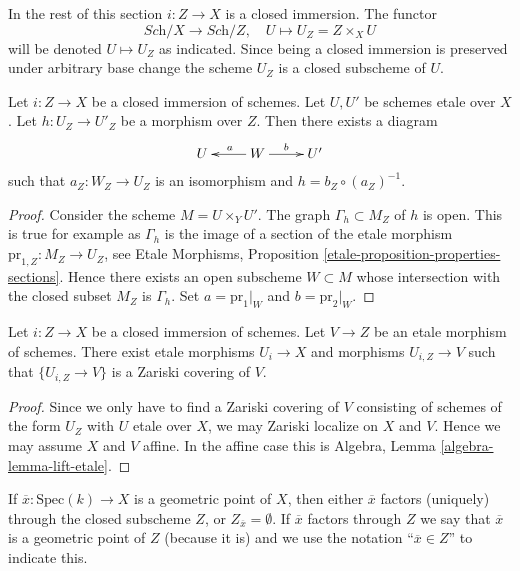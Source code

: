 \medskip\noindent
In the rest of this section $i : Z \to X$ is a closed immersion.
The functor
$$
\textit{Sch}/X \longrightarrow \textit{Sch}/Z,\quad
U \longmapsto U_Z = Z \times_X U
$$
will be denoted $U \mapsto U_Z$ as indicated. Since being a closed immersion
is preserved under arbitrary base change the scheme $U_Z$ is a closed subscheme
of $U$.

\begin{lemma}
\label{lemma-closed-immersion-almost-full}
Let $i : Z \to X$ be a closed immersion of schemes.
Let $U, U'$ be schemes etale over $X$. Let $h : U_Z \to U'_Z$
be a morphism over $Z$. Then there exists a diagram
$$
\xymatrix{
U & W \ar[l]_a \ar[r]^b & U'
}
$$
such that $a_Z : W_Z \to U_Z$ is an isomorphism and $h = b_Z \circ (a_Z)^{-1}$.
\end{lemma}

\begin{proof}
Consider the scheme $M = U \times_Y U'$. The graph $\Gamma_h \subset M_Z$
of $h$ is open. This is true for example as $\Gamma_h$ is the image of a
section of the etale morphism $\text{pr}_{1, Z} : M_Z \to U_Z$, see
Etale Morphisms, Proposition \ref{etale-proposition-properties-sections}.
Hence there exists an open subscheme $W \subset M$ whose intersection with
the closed subset $M_Z$ is $\Gamma_h$. Set $a = \text{pr}_1|_W$
and $b = \text{pr}_2|_W$.
\end{proof}

\begin{lemma}
\label{lemma-closed-immersion-almost-essentially-surjective}
Let $i : Z \to X$ be a closed immersion of schemes.
Let $V \to Z$ be an etale morphism of schemes.
There exist etale morphisms $U_i \to X$ and morphisms
$U_{i, Z} \to V$ such that $\{U_{i, Z} \to V\}$
is a Zariski covering of $V$.
\end{lemma}

\begin{proof}
Since we only have to find a Zariski covering of $V$ consisting of schemes
of the form $U_Z$ with $U$ etale over $X$, we may Zariski localize on $X$
and $V$. Hence we may assume $X$ and $V$ affine. In the affine case this is
Algebra, Lemma \ref{algebra-lemma-lift-etale}.
\end{proof}

\noindent
If $\overline{x} : \text{Spec}(k) \to X$ is a geometric point of $X$, then
either $\overline{x}$ factors (uniquely) through the closed subscheme $Z$, or
$Z_{\overline{x}} = \emptyset$. If $\overline{x}$ factors through $Z$
we say that $\overline{x}$ is a geometric point of $Z$ (because it is) and
we use the notation ``$\overline{x} \in Z$'' to indicate this.

